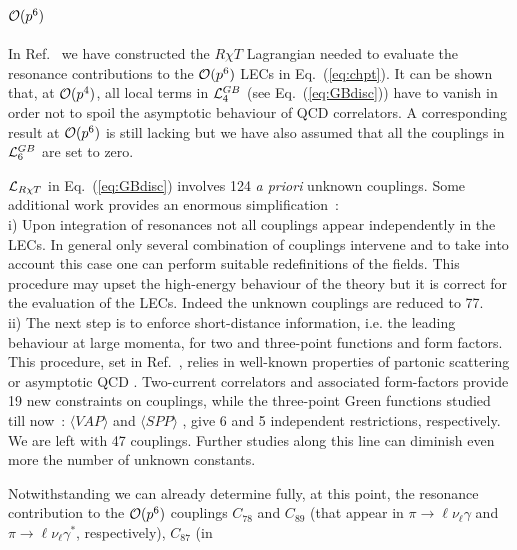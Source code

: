 \documentclass{appolb}
\begin{document}
{\subsection{${\cal O}(p^6)$}
In Ref.~\cite{Cirigliano:2006hb} we have constructed the $R \chi T$ Lagrangian needed to evaluate the resonance
contributions to the ${\cal O}(p^6)$ LECs in Eq.~(\ref{eq:chpt}). 
It can be shown \cite{Ecker:1989yg} that, at  ${\cal O}(p^4)$, all local terms in ${\cal L}_4^{GB}$ 
(see Eq.~(\ref{eq:GBdisc})) have to vanish in order not to spoil the asymptotic behaviour of QCD correlators. A corresponding result at ${\cal O}(p^6)$ is still lacking but we have also assumed that all the couplings in ${\cal L}_6^{GB}$ are set to zero.
\par
${\cal L}_{R \chi T}$ in Eq.~(\ref{eq:GBdisc}) involves 124 {\em a priori} unknown couplings. Some
additional work provides an enormous simplification~: \vspace*{0.2cm} \\
i) Upon integration of resonances not all couplings appear independently in the LECs. In general only several 
combination of couplings intervene and to take into account this case one can perform suitable redefinitions of
the fields. This procedure may upset the high-energy behaviour of the theory but it is correct for the evaluation of the LECs. Indeed the unknown couplings are reduced to 77.
 \vspace*{0.1cm} \\
ii) 
The next step is to enforce short-distance information, i.e. the leading behaviour at large momenta, for two and three-point functions and form factors. This procedure, set in Ref.~\cite{Ecker:1989yg}, relies in well-known properties of partonic scattering or asymptotic QCD \cite{Froissart:1961ux}. 
Two-current correlators and associated form-factors provide 19 new constraints on couplings, while the three-point
Green functions studied till now~: $\langle VAP \rangle$ \cite{Cirigliano:2004ue} and $\langle SPP \rangle$
\cite{Cirigliano:2006hb,Cirigliano:2005xn}, give 6 and 5 independent restrictions, respectively. 
We are left  with 47 couplings. Further studies along this line can diminish even more the number
of unknown constants.
\vspace*{0.2cm} 
\par 
Notwithstanding we can already determine fully, at this point, the resonance contribution to the ${\cal O}(p^6)$ couplings $C_{78}$ and $C_{89}$ (that appear in $\pi \rightarrow 
\ell \nu_{\ell} \gamma$ and $\pi \rightarrow \ell \nu_{\ell} \gamma^*$, respectively), $C_{87}$ (in 
}
\end{document}
